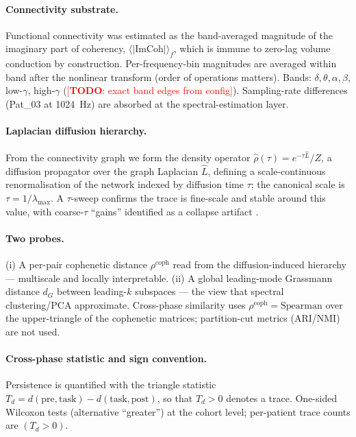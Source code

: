 \documentclass[11pt]{article}
\newcommand{\rhocoph}{\ensuremath{\rho^{\mathrm{coph}}}}
\newcommand{\dG}{\ensuremath{d_{G}}}
\newcommand{\rhat}{\ensuremath{\hat{\rho}(\tau)}}
\newcommand{\TODO}[1]{\textcolor{red}{[\textbf{TODO}: #1]}}
\begin{document}
\paragraph{Connectivity substrate.}
Functional connectivity was estimated as the band-averaged magnitude of the
imaginary part of coherency, $\langle|\mathrm{ImCoh}|\rangle_f$, which is immune
to zero-lag volume conduction by construction. Per-frequency-bin magnitudes are
averaged within band after the nonlinear transform (order of operations matters).
Bands: $\delta,\theta,\alpha,\beta$, low-$\gamma$, high-$\gamma$
(\TODO{exact band edges from config}). Sampling-rate differences (Pat\_03 at
1024~Hz) are absorbed at the spectral-estimation layer.

\paragraph{Laplacian diffusion hierarchy.}
From the connectivity graph we form the density operator
$\rhat=e^{-\tau\hat L}/Z$, a diffusion propagator over the graph Laplacian
$\hat L$, defining a scale-continuous renormalisation of the network indexed by
diffusion time $\tau$; the canonical scale is $\tau=1/\lambda_{\max}$. A
$\tau$-sweep confirms the trace is fine-scale and stable around this value, with
coarse-$\tau$ ``gains'' identified as a collapse artifact
.

\paragraph{Two probes.}
(i) A per-pair cophenetic distance \rhocoph{} read from the diffusion-induced
hierarchy --- multiscale and locally interpretable. (ii) A global leading-mode
Grassmann distance \dG{} between leading-$k$ subspaces --- the view that spectral
clustering/PCA approximate. Cross-phase similarity uses
$\rho^{\mathrm{coph}}=\mathrm{Spearman}$ over the upper-triangle of the cophenetic
matrices; partition-cut metrics (ARI/NMI) are not used.

\paragraph{Cross-phase statistic and sign convention.}
Persistence is quantified with the triangle statistic
$T_d = d(\text{pre},\text{task}) - d(\text{task},\text{post})$, so that $T_d>0$
denotes a trace. One-sided Wilcoxon tests (alternative ``greater'') at the cohort
level; per-patient trace counts are $(T_d>0)$.
\end{document}

